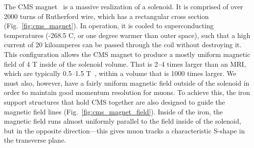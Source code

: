 The CMS magnet~\cite{CERN-LHCC-97-010} is a massive\footnotemark{} realization of a solenoid. 
It is comprised of over 2000 turns of Rutherford wire, which has a rectangular cross section (Fig.~\ref{fig:cms_magnet}). 
In operation, it is cooled to superconducting temperatures (-268.5 \de{}C, or one degree warmer than outer space), such that a high current of 20 kiloamperes\footnotemark{} can be passed through the coil without destroying it. 
This configuration allows the CMS magnet to produce a mostly uniform magnetic field of 4 T inside of the solenoid volume. 
That is 2--4 times larger than an MRI, which are typically 0.5--1.5 T~\cite{Berger2002-gs}, within a volume that is 1000 times larger. %
We must also, however, have a fairly uniform magnetic field outside of the solenoid in order to maintain good momentum resolution for muons. 
To achieve this, the iron support structures that hold CMS together are also designed to guide the magnetic field lines (Fig.~\ref{fig:cms_magnet_field}). 
Inside of the iron, the magnetic field runs almost uniformly parallel to the field inside of the solenoid, but in the opposite direction---this gives muon tracks a characteristic S-shape in the transverse plane. 

